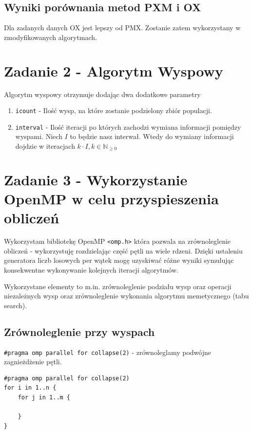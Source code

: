\documentclass{article}
\begin{document}
\subsection{Wyniki porównania metod PXM i OX}

Dla zadanych danych OX jest lepszy od PMX. Zostanie zatem wykorzystany w zmodyfikowanych algorytmach.

\section{Zadanie 2 - Algorytm Wyspowy}

Algorytm wyspowy otrzymuje dodając dwa dodatkowe parametry
\begin{enumerate}
    \item \texttt{icount} - Ilość wysp, na które zostanie podzielony zbiór populacji.
    \item \texttt{interval} - Ilość iteracji po których zachodzi wymiana informacji pomiędzy wyspami.
    Niech $I$ to będzie nasz interwał. Wtedy do wymiany informacji dojdzie w iteracjach $k\cdot I, k\in\mathbb{N}_{\geq 0}$
\end{enumerate}

\section{Zadanie 3 - Wykorzystanie OpenMP w celu przyspieszenia obliczeń}

Wykorzystam bibliotekę OpenMP \texttt{<omp.h>} która pozwala na zrównoleglenie obliczeń - wykorzystuję 
rozdzielając część pętli na wiele rdzeni. Dzięki ustaleniu generatora liczb losowych per wątek mogę
uzyskiwać różne wyniki symulując konsekwentne wykonywanie kolejnych iteracji algorytmów.  

Wykorzystane elementy to m.in. zrównoleglenie podziału wysp oraz operacji niezależnych wysp oraz zrównoleglenie wykonania
algorytmu memetycznego (tabu search).

\subsection{Zrównoleglenie przy wyspach}

\texttt{\#pragma omp parallel for collapse(2)} - zrównoleglamy podwójne zagnieżdżenie pętli.

\begin{verbatim}
#pragma omp parallel for collapse(2)
for i in 1..n {
    for j in 1..m {

    }
}
\end{verbatim}
\end{document}
